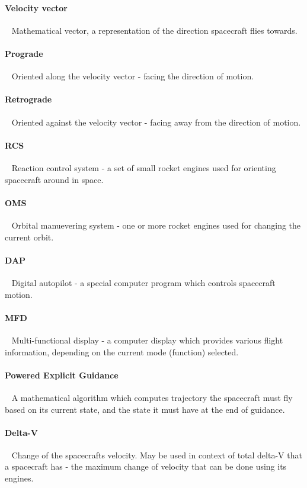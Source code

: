 \paragraph{Velocity vector}~
Mathematical vector, a representation of the direction spacecraft flies towards.

\paragraph{Prograde}~
Oriented along the velocity vector - facing the direction of motion.

\paragraph{Retrograde}~
Oriented against the velocity vector - facing away from the direction of motion.

\paragraph{RCS}~
Reaction control system - a set of small rocket engines used for orienting spacecraft around in space.

\paragraph{OMS}~
Orbital manuevering system - one or more rocket engines used for changing the current orbit.

\paragraph{DAP}~
Digital autopilot - a special computer program which controls spacecraft motion.

\paragraph{MFD}~
Multi-functional display - a computer display which provides various flight information, depending on the current mode (function) selected.

\paragraph{Powered Explicit Guidance}~
A mathematical algorithm which computes trajectory the spacecraft must fly based on its current state, and the state it must have at the end of guidance.

\paragraph{Delta-V}~
Change of the spacecrafts velocity. May be used in context of total delta-V that a spacecraft has - the maximum change of velocity that can be done using its engines.

